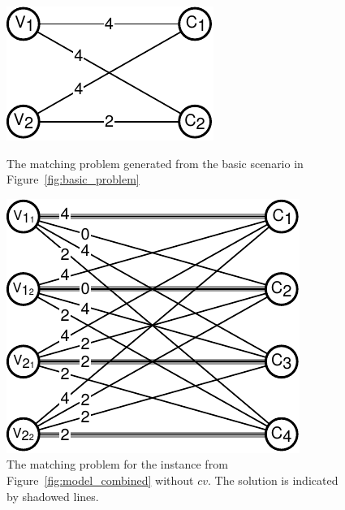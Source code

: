 \documentclass[9pt,twocolumn]{scrartcl}
\begin{document}
\begin{figure}
\begin{minipage}[b]{0.49\linewidth}
\centering
\includegraphics[width =\columnwidth]{figs/matching_basic}
\caption{The matching problem generated from the basic scenario in
Figure~\ref{fig:basic_problem}}
\label{fig:matching_basic}
\end{minipage}
\quad
\begin{minipage}[b]{0.49\linewidth}
\includegraphics[width = \columnwidth]{figs/matching}
\caption{The matching problem for the instance from
Figure~\ref{fig:model_combined} without $cv$. The solution is indicated by
shadowed lines.}
\label{fig:matching}
\end{minipage}
\end{figure}
\end{document}
